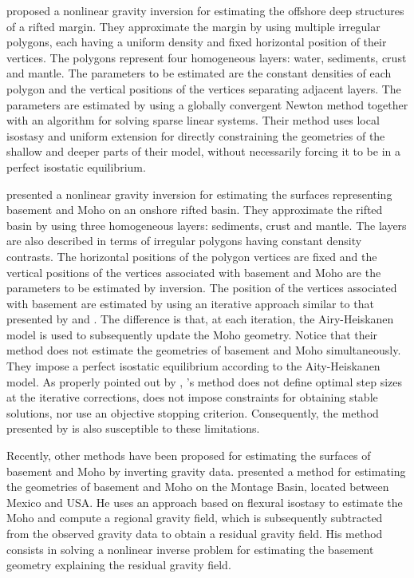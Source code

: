 \documentclass[manuscript]{geophysics}
\begin{document}
\citet{condi-etal1999} proposed a nonlinear gravity inversion for estimating the
offshore deep structures of a rifted margin.
They approximate the margin by using multiple irregular polygons, each having a 
uniform density and fixed horizontal position of their vertices.
The polygons represent four homogeneous layers: water, sediments, crust and mantle.
The parameters to be estimated are the constant densities of each polygon and 
the vertical positions of the vertices separating adjacent layers.
The parameters are estimated by using a globally convergent Newton method
together with an algorithm for solving sparse linear systems.
Their method uses local isostasy and uniform extension for directly constraining the 
geometries of the shallow and deeper parts of their model, without necessarily
forcing it to be in a perfect isostatic equilibrium.

\citet{salem-etal2014} presented a nonlinear gravity inversion for estimating the 
surfaces representing basement and Moho on an onshore rifted basin. 
They approximate the rifted basin by using three homogeneous layers: sediments, crust and mantle.
The layers are also described in terms of irregular polygons having constant density
contrasts.
The horizontal positions of the polygon vertices are fixed and the vertical positions
of the vertices associated with basement and Moho are the parameters to be estimated by 
inversion.
The position of the vertices associated with basement are estimated 
by using an iterative approach similar to that
presented by \citet{bott1960} and \citet{cordell-henderson1968}. 
The difference is that, at each iteration, the Airy-Heiskanen model
is used to subsequently update the Moho geometry.
Notice that their method does not estimate the geometries of basement and Moho 
simultaneously.
They impose a perfect isostatic equilibrium according to the Aity-Heiskanen model.
As properly pointed out by \citet{silva-etal2014}, \citeauthor{bott1960}'s
method does not define optimal step sizes at the iterative corrections,
does not impose constraints for obtaining stable solutions, nor use
an objective stopping criterion. 
Consequently, the method presented by \citet{salem-etal2014} is also susceptible 
to these limitations.

Recently, other methods have been proposed for estimating the surfaces of basement
and Moho by inverting gravity data.
\citet{garcia-abdeslem2017} presented a method for estimating the 
geometries of basement and Moho on the Montage Basin, located between Mexico and USA.
He uses an approach based on flexural isostasy to estimate the Moho and compute 
a regional gravity field, which is subsequently subtracted from the observed gravity 
data to obtain a residual gravity field. 
His method consists in solving a nonlinear inverse problem for estimating the
basement geometry explaining the residual gravity field.
\end{document}
